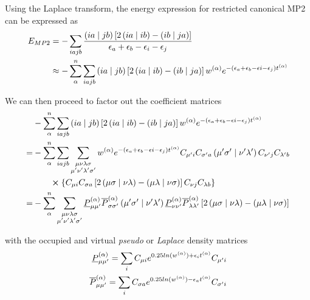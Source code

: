 Using the Laplace transform, the energy expression for restricted canonical MP2 can be expressed as
\begin{equation}
\begin{split}
E_{MP2} &= - \sum_{iajb} \frac{\left( ia \mid jb \right) \left[2 \left( ia \mid ib \right) - \left( ib \mid ja \right) \right]}{\epsilon_a + \epsilon_b - \epsilon_i - \epsilon_j} \\
&\approx - \sum_{\alpha}^n \sum_{iajb} \left( ia \mid jb \right) \left[2 \left( ia \mid ib \right) - \left( ib \mid ja \right) \right] w^{(\alpha)} e^{-\left(\epsilon_a + \epsilon_b - \epsilon i - \epsilon_j\right)t^{(\alpha)}}
\end{split}
\end{equation}

\noindent We can then proceed to factor out the coefficient matrices 
\begin{equation}
\begin{split}
&- \sum_{\alpha}^n \sum_{iajb} \left( ia \mid jb \right) \left[2 \left( ia \mid ib \right) - \left( ib \mid ja \right) \right] w^{(\alpha)} e^{-\left(\epsilon_a + \epsilon_b - \epsilon i - \epsilon_j\right)t^{(\alpha)}} \\
= &- \sum_{\alpha}^n \sum_{iajb} \sum_{\substack{\mu\nu\lambda\sigma \\ \mu'\nu'\lambda'\sigma'} } w^{(\alpha)} e^{-\left(\epsilon_a + \epsilon_b - \epsilon i - \epsilon_j\right)t^{(\alpha)}} C_{\mu' i} C_{\sigma' a} \left( \mu'\sigma' \mid \nu'\lambda' \right) C_{\nu' j} C_{\lambda' b} \\ 
 & \qquad \cross \left\lbrace C_{\mu i} C_{\sigma a} \left [ 2\left( \mu\sigma \mid \nu\lambda \right) -  \left( \mu\lambda \mid \nu\sigma \right) \right] C_{\nu j} C_{\lambda b} \right\rbrace  \\
= & - \sum_{\alpha}^n \sum_{\substack{\mu\nu\lambda\sigma \\ \mu'\nu'\lambda'\sigma'}} \underline{P}^{(\alpha)}_{\mu\mu'} \overline{P}^{(\alpha)}_{\sigma\sigma'} \left( \mu'\sigma' \mid \nu'\lambda' \right) \underline{P}^{(\alpha)}_{\nu\nu'} \overline{P}^{(\alpha)}_{\lambda\lambda'} \left [ 2\left( \mu\sigma \mid \nu\lambda \right) -  \left( \mu\lambda \mid \nu\sigma \right) \right] 
\end{split}
\end{equation}

\noindent with the occupied and virtual \emph{pseudo} or \emph{Laplace} density matrices 
\begin{equation}
\begin{split}
\underline{P}^{(\alpha)}_{\mu\mu'} = \sum_i C_{\mu i} e^{0.25 ln(w^{(\alpha)}) + \epsilon_i t^{(\alpha)}} C_{\mu' i} \\
\overline{P}^{(\alpha)}_{\mu\mu'} = \sum_i C_{\sigma a} e^{0.25 ln(w^{(\alpha)}) - \epsilon_a t^{(\alpha)}} C_{\sigma' i}
\end{split}
\end{equation}

